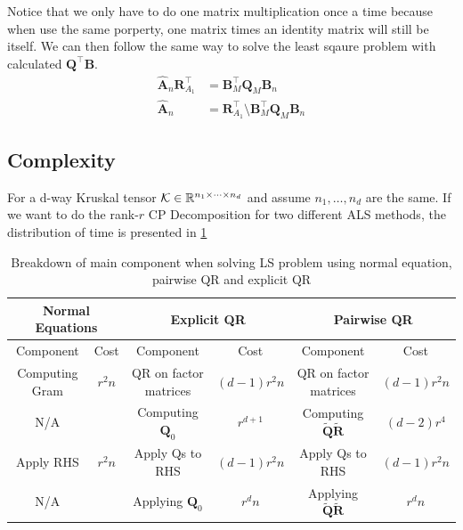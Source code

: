 \documentclass{article}
\newcommand{\mat}[1]{\mathbf{#1}}
\newcommand{\T}[2][]{#1{\mathbf{\cal{#2}}}} 						%
\begin{document}
Notice that we only have to do one matrix multiplication once a time because when use the same porperty, one matrix times an identity matrix will still be itself.
We can then follow the same way to solve the least sqaure problem with calculated $\mat{Q}^\top\mat{B}$.
\begin{align}
  \mat{\hat{A}}_n \mat{R}^\top_{A_1} &= \mat{B}^\top_M\mat{Q}_M\mat{B}_n \nonumber \\ 
  \mat{\hat{A}}_n &= \mat{R}^\top_{A_1} \text{\textbackslash} \mat{B}^\top_M\mat{Q}_M\mat{B}_n \nonumber 
\end{align}




\subsection{Complexity}

For a d-way Kruskal tensor $\T{K} \in \mathbb{R}^{n_1 \times \dots \times n_d}$ and assume $n_1, \dots , n_d$ are the same. If we want to do the rank-$r$ CP Decomposition
for two different ALS methods, the distribution of time is presented in \cref{tab:its_parts}


\begin{table}[!ht]
  
  \centering
  \begin{tabular}{|c|c|c|c|c|c|}
    \hline
    \multicolumn{2}{|c|}{\textbf{Normal Equations}} & \multicolumn{2}{|c|}{\textbf{Explicit QR}} & \multicolumn{2}{|c|}{\textbf{Pairwise QR}} \\
    \hline
    Component & Cost & Component & Cost & Component & Cost \\
    \hline
    Computing Gram & $r^2n$&QR on factor matrices & $(d-1)r^2n$ & QR on factor matrices & $(d-1)r^2n$\\
    N/A& &Computing $\mat{Q}_0$ & $r^{d+1}$& Computing $\tilde{\mat{Q}}\tilde{\mat{R}}$& $(d-2)r^4$\\
    Apply RHS&  $r^2n$&Apply Qs to RHS & $(d-1)r^2n$ & Apply Qs to RHS& $(d-1)r^2n$ \\
    N/A & &Applying $\mat{Q}_0$& $r^dn$& Applying $\tilde{\mat{Q}}\tilde{\mat{R}}$& $r^dn$\\
     \hline
  \end{tabular}
  \caption{Breakdown of main component when solving LS problem using normal equation, pairwise QR and explicit QR}
  \label{tab:its_parts}
  \end{table}

  
\end{document}
